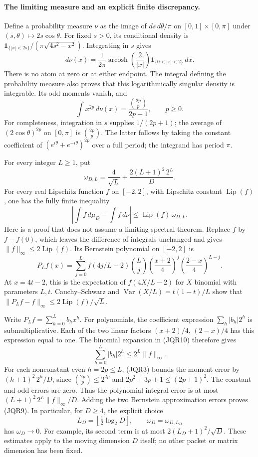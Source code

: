 \paragraph{The limiting measure and an explicit finite discrepancy.}
Define a probability measure \(\nu\) as the image of
\(ds\,d\theta/\pi\) on \([0,1]\times[0,\pi]\) under
\((s,\theta)\mapsto2s\cos\theta\).  For fixed \(s>0\), its conditional
density is
\(\mathbf1_{\{|x|<2s\}}/(\pi\sqrt{4s^2-x^2})\).
Integrating in \(s\) gives
\[
 d\nu(x)=
 \frac1{2\pi}\operatorname{arcosh}\!\left(\frac2{|x|}\right)
 \mathbf1_{\{0<|x|<2\}}\,dx.
 \tag{JQR6}
\]
There is no atom at zero or at either endpoint.  The integral defining
the probability measure also proves that this logarithmically singular
density is integrable.  Its odd moments vanish, and
\[
 \int x^{2p}\,d\nu(x)=\frac{\binom{2p}{p}}{2p+1},\qquad p\geq0.
 \tag{JQR7}
\]
For completeness, integration in \(s\) supplies \(1/(2p+1)\);
the average of \((2\cos\theta)^{2p}\) on \([0,\pi]\) is
\(\binom{2p}{p}\).  The latter follows by taking the constant coefficient
of \((e^{i\theta}+e^{-i\theta})^{2p}\) over a full period; the integrand
has period \(\pi\).

For every integer \(L\geq1\), put
\[
 \omega_{D,L}=\frac4{\sqrt L}
               +\frac{2(L+1)^2\,2^L}{D}.
 \tag{JQR8}
\]
For every real Lipschitz function \(f\) on \([-2,2]\), with Lipschitz
constant \(\operatorname{Lip}(f)\), one has the fully finite inequality
\[
 \left|\int f\,d\mu_D-\int f\,d\nu\right|
 \leq \operatorname{Lip}(f)\,\omega_{D,L}.
 \tag{JQR9}
\]
Here is a proof that does not assume a limiting spectral theorem.
Replace \(f\) by \(f-f(0)\), which leaves the difference of integrals
unchanged and gives \(\|f\|_\infty\leq2\operatorname{Lip}(f)\).
Its Bernstein polynomial on \([-2,2]\) is
\[
 P_Lf(x)=\sum_{j=0}^L f(4j/L-2)\binom Lj
       \left(\frac{x+2}{4}\right)^j
       \left(\frac{2-x}{4}\right)^{L-j}.
 \tag{JQR10}
\]
At \(x=4t-2\), this is the expectation of \(f(4X/L-2)\) for
\(X\) binomial with parameters \(L,t\).  Cauchy--Schwarz and
\(\operatorname{Var}(X/L)=t(1-t)/L\) show that
\(\|P_Lf-f\|_\infty\leq2\operatorname{Lip}(f)/\sqrt L\).

Write \(P_Lf=\sum_{h=0}^L b_hx^h\).
For polynomials, the coefficient expression
\(\sum_h|b_h|2^h\) is submultiplicative.  Each of the two linear factors
\((x+2)/4\), \((2-x)/4\) has this expression equal to one.
The binomial expansion in (JQR10) therefore gives
\[
 \sum_{h=0}^L|b_h|2^h\leq2^L\|f\|_\infty.
 \tag{JQR11}
\]
For each nonconstant even \(h=2p\leq L\), (JQR3) bounds the moment
error by \((h+1)^2\,2^h/D\), since
\(\binom{2p}{p}\leq2^{2p}\) and
\(2p^2+3p+1\leq(2p+1)^2\).  The constant and odd errors are zero.
Thus the polynomial integral error is at most
\((L+1)^2\,2^L\|f\|_\infty/D\).
Adding the two Bernstein approximation errors proves (JQR9).
In particular, for \(D\geq4\), the explicit choice
\[
 L_D=\left\lfloor\tfrac12\log_2D\right\rfloor,\qquad
 \omega_D=\omega_{D,L_D}
 \tag{JQR12}
\]
has \(\omega_D\to0\).  For example, its second term is at most
\(2(L_D+1)^2/\sqrt D\).  These estimates apply to the moving dimension
\(D\) itself; no other packet or matrix dimension has been fixed.

